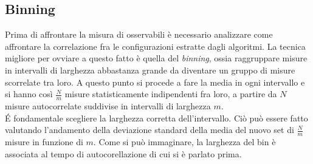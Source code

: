 \subsection{Binning}
Prima di affrontare la misura di osservabili è necessario analizzare come affrontare la correlazione fra le configurazioni estratte dagli algoritmi.
La tecnica migliore per ovviare a questo fatto è quella del \emph{binning}, ossia raggruppare misure in intervalli di larghezza abbastanza grande da diventare un gruppo di misure scorrelate tra loro.
A questo punto si procede a fare la media in ogni intervallo e si hanno così $\frac{N}{m}$ misure statisticamente indipendenti fra loro, a partire da $N$ misure autocorrelate suddivise in intervalli di larghezza $m$.\\
\'E fondamentale scegliere la larghezza corretta dell'intervallo. Ciò può essere fatto valutando l'andamento
della deviazione standard della media del nuovo set di $\frac{N}{m}$ misure in funzione di $m$.
Come si può immaginare, la larghezza del bin è associata al tempo di autocorellazione di cui si è parlato prima. 

